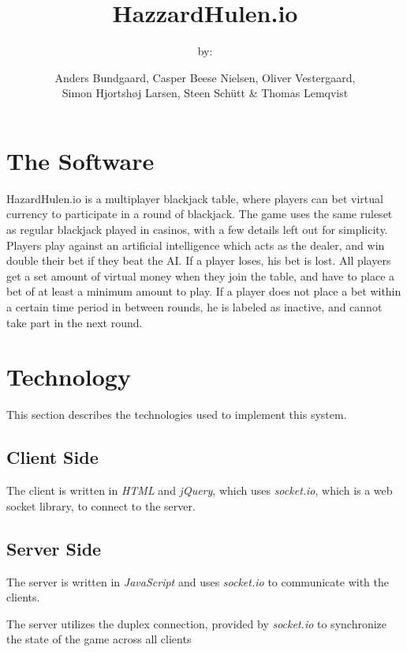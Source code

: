 \documentclass[a4paper]{article}
\title{HazzardHulen.io\vfill}
\author{
by: \\[.4cm]\and
  Anders Bundgaard,
  Casper Beese Nielsen,
  Oliver Vestergaard,\\
  Simon Hjortshøj Larsen,
  Steen Schütt \& 
  Thomas Lemqvist\\[1cm]
 }
\begin{document}
\maketitle
\newpage
\tableofcontents
\newpage


\section{The Software}
HazardHulen.io is a multiplayer blackjack table, where players can bet virtual
currency to participate in a round of blackjack. The game uses the same ruleset
as regular blackjack played in casinos, with a few details left out for
simplicity.
Players play against an artificial intelligence which acts as the dealer, and
win double their bet if they beat the AI. If a player loses, his bet is lost.
All players get a set amount of virtual money when they join the table, and have
to place a bet of at least a minimum amount to play. If a player does not place
a bet within a certain time period in between rounds, he is labeled as inactive,
and cannot take part in the next round.
\section{Technology}
This section describes the technologies used to implement this system.
\subsection{Client Side}
The client is written in \textit{HTML} and \textit{jQuery}, which uses \textit{socket.io}, which is
a web socket library, to connect to the server.
\subsection{Server Side}
The server is written in \textit{JavaScript} and uses \textit{socket.io} to communicate with
the clients.

The server utilizes the duplex connection, provided by \textit{socket.io} to
synchronize the state of the game across all clients
\end{document}
